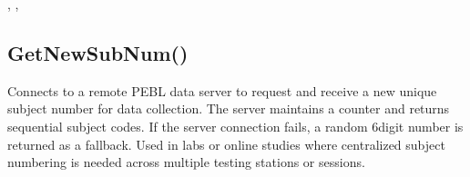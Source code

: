 \documentclass[letterpaper,10pt,english]{sphinxmanual}
\begin{document}
\sphinxAtStartPar
{}, , 

\ignorespaces 

\subsection{GetNewSubNum()}
\label{\detokenize{reference/utility:getnewsubnum}}\label{\detokenize{reference/utility:index-51}}
\sphinxAtStartPar
{}

\sphinxAtStartPar
{}

\sphinxAtStartPar
Connects to a remote PEBL data server to request and receive a new unique subject number for data collection. The server maintains a counter and returns sequential subject codes. If the server connection fails, a random 6\sphinxhyphen{}digit number is returned as a fallback. Used in labs or online studies where centralized subject numbering is needed across multiple testing stations or sessions.

\sphinxAtStartPar
{}

\begin{sphinxVerbatim}[commandchars=\\\{\}]
\end{sphinxVerbatim}

\sphinxAtStartPar
{}
\end{document}
